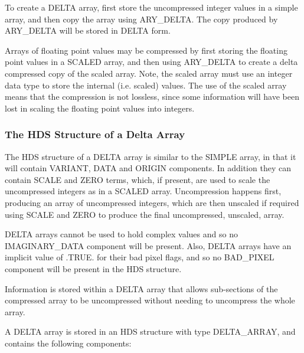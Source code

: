 \documentclass[twoside,11pt,nolof]{starlink}
\begin{document}
To create a DELTA array, first store the uncompressed integer values in a
simple array, and then copy the array using ARY\_DELTA. The copy produced
by ARY\_DELTA will be stored in DELTA form.

Arrays of floating point values may be compressed by first storing the
floating point values in a SCALED array, and then using ARY\_DELTA to
create a delta compressed copy of the scaled array. Note, the scaled
array must use an integer data type to store the internal (i.e. scaled)
values. The use of the scaled array means that the compression is not
lossless, since some information will have been lost in scaling the
floating point values into integers.

\subsubsection{The HDS Structure of a Delta Array}
The HDS structure of a DELTA array is similar to the SIMPLE array,
in that it will contain VARIANT, DATA and ORIGIN components. In
addition they can contain SCALE and ZERO terms, which, if present,
are used to scale the uncompressed integers as in a SCALED array.
Uncompression happens first, producing an array of uncompressed
integers, which are then unscaled if required using SCALE and ZERO to
produce the final uncompressed, unscaled, array.

DELTA arrays cannot be used to hold complex values and so no
IMAGINARY\_DATA component will be present. Also, DELTA arrays have an
implicit value of .TRUE. for their bad pixel flags, and so no BAD\_PIXEL
component will be present in the HDS structure.

Information is stored within a DELTA array that allows sub-sections of
the compressed array to be uncompressed without needing to uncompress the
whole array.

A DELTA array is stored in an HDS structure with type DELTA\_ARRAY, and
contains the following components:
\end{document}
